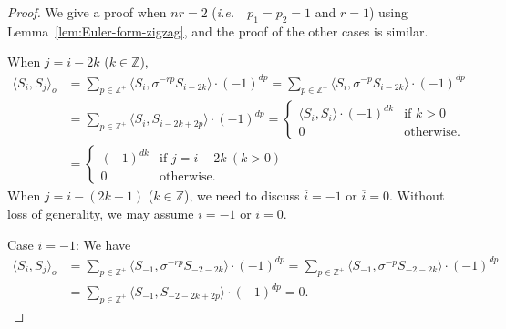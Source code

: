 \documentclass[reqno,12pt,a4paper]{amsart}
\theoremstyle{remark}
\theoremstyle{definition}
\newcommand{\ie}{{\em i.e.~}\ }
\numberwithin{equation}{section}
\begin{document}
\begin{proof}
We give a proof when $nr=2$ (\ie $p_1=p_2=1$ and $r=1$) using Lemma~\ref{lem:Euler-form-zigzag}, and the proof of the other cases is similar.

When $j=i-2k$ ($k\in\mathbb{Z}$),
\begin{align*}
\langle S_i,S_j\rangle_o &=\sum_{p\in \mathbb{Z}^+}\langle S_i,\sigma^{-rp}S_{i-2k}\rangle\cdot(-1)^{dp}=\sum_{p\in \mathbb{Z}^+}\langle S_i,\sigma^{-p}S_{i-2k}\rangle\cdot(-1)^{dp}\\
&=\sum_{p\in \mathbb{Z}^+}\langle S_i,S_{i-2k+2p}\rangle\cdot(-1)^{dp}=
\begin{cases}
    \langle S_i,S_{i}\rangle\cdot(-1)^{dk} & \text{if }k>0\\
    0 & \text{otherwise}.
    \end{cases}\\
&=
\begin{cases}
    (-1)^{dk} & \text{if }j=i-2k ~(k>0)\\
    0 & \text{otherwise}.
    \end{cases}
\end{align*}
When $j=i-(2k+1)$ ($k \in \mathbb{Z}$), we need to discuss $\overline{i}=-1$ or $\overline{i}=0$. Without loss of generality, we may assume $i=-1$ or $i=0$.

Case $i=-1$: We have
  \begin{align*}
  \langle S_i,S_j\rangle_o &=\sum_{p\in \mathbb{Z}^+}\langle S_{-1},\sigma^{-rp}S_{-2-2k}\rangle\cdot(-1)^{dp}=\sum_{p\in \mathbb{Z}^+}\langle S_{-1},\sigma^{-p}S_{-2-2k}\rangle\cdot(-1)^{dp}\\
  &=\sum_{p\in \mathbb{Z}^+}\langle S_{-1},S_{-2-2k+2p}\rangle\cdot(-1)^{dp}=0.
  \end{align*}


\end{proof}
\end{document}
